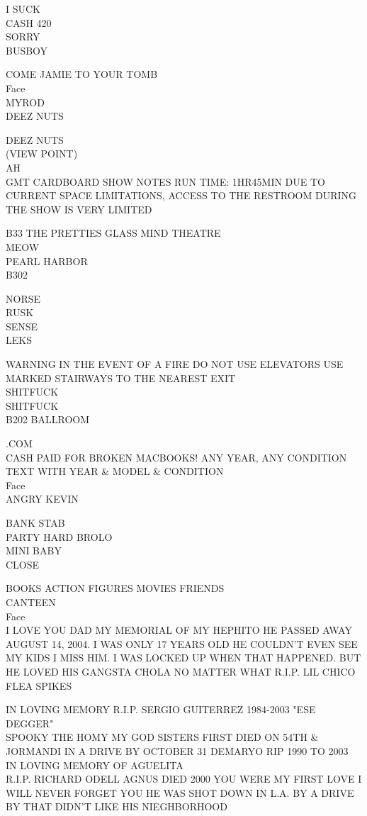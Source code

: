 \documentclass[10pt,letterpaper]{article}
\begin{document}
I SUCK\\
CASH 420\\
SORRY\\
BUSBOY

COME JAMIE TO YOUR TOMB\\
Face\\
MYROD\\
DEEZ NUTS

DEEZ NUTS\\
(VIEW POINT)\\
AH\\
GMT CARDBOARD SHOW NOTES RUN TIME: 1HR45MIN DUE TO CURRENT SPACE LIMITATIONS, ACCESS TO THE RESTROOM DURING THE SHOW IS VERY LIMITED

B33 THE PRETTIES GLASS MIND THEATRE\\
MEOW\\
PEARL HARBOR\\
B302

NORSE\\
RUSK\\
SENSE\\
LEKS

WARNING IN THE EVENT OF A FIRE DO NOT USE ELEVATORS USE MARKED STAIRWAYS TO THE NEAREST EXIT\\
SHITFUCK\\
SHITFUCK\\
B202 BALLROOM

.COM\\
CASH PAID FOR BROKEN MACBOOKS!  ANY YEAR, ANY CONDITION TEXT WITH YEAR \& MODEL \& CONDITION\\
Face\\
ANGRY KEVIN

BANK STAB\\
PARTY HARD BROLO\\
MINI BABY\\
CLOSE

BOOKS ACTION FIGURES MOVIES FRIENDS\\
CANTEEN\\
Face\\
I LOVE YOU DAD MY MEMORIAL OF MY HEPHITO HE PASSED AWAY AUGUST 14, 2004.  I WAS ONLY 17 YEARS OLD HE COULDN'T EVEN SEE MY KIDS I MISS HIM.  I WAS LOCKED UP WHEN THAT HAPPENED.  BUT HE LOVED HIS GANGSTA CHOLA NO MATTER WHAT R.I.P. LIL CHICO FLEA SPIKES

IN LOVING MEMORY R.I.P. SERGIO GUITERREZ 1984{-}2003 "ESE DEGGER"\\
SPOOKY THE HOMY MY GOD SISTERS FIRST DIED ON 54TH \& JORMANDI IN A DRIVE BY OCTOBER 31 DEMARYO RIP 1990 TO 2003\\
IN LOVING MEMORY OF AGUELITA\\
R.I.P. RICHARD ODELL AGNUS DIED 2000 YOU WERE MY FIRST LOVE I WILL NEVER FORGET YOU HE WAS SHOT DOWN IN L.A. BY A DRIVE BY THAT DIDN'T LIKE HIS NIEGHBORHOOD
\end{document}
